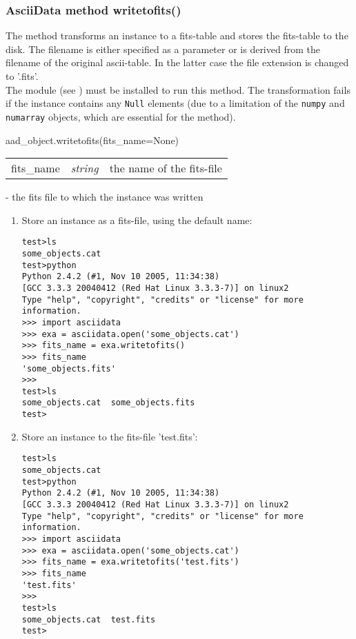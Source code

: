 \subsubsection{AsciiData method writetofits()}
\label{adm_writetofits}
%
The method transforms an \ad instance to a fits-table and stores
the fits-table to the disk. The filename is either specified as a parameter
or is derived from the filename of the original ascii-table. In the latter
case the file extension is changed to '.fits'.\\
The module  (see )
must be installed to run this method. The transformation fails if the
\ad instance contains any {\tt Null} elements (due to a limitation
of the {\tt numpy} and {\tt numarray} objects, which are essential for the
method).

aad\_object.writetofits(fits\_name=None)


\begin{tabular}{lcl}
fits\_name & {\it string} & the name of the fits-file\\
\end{tabular}

- the fits file to which the \ad instance was written

\begin{enumerate}
\item Store an \ad instance as a fits-file, using the default name:
\begin{small}
\begin{verbatim}
test>ls
some_objects.cat
test>python
Python 2.4.2 (#1, Nov 10 2005, 11:34:38)
[GCC 3.3.3 20040412 (Red Hat Linux 3.3.3-7)] on linux2
Type "help", "copyright", "credits" or "license" for more information.
>>> import asciidata
>>> exa = asciidata.open('some_objects.cat')
>>> fits_name = exa.writetofits()
>>> fits_name
'some_objects.fits'
>>>
test>ls
some_objects.cat  some_objects.fits
test>
\end{verbatim}
\end{small}


\item Store an \ad instance to the fits-file 'test.fits':
\begin{small}
\begin{verbatim}
test>ls
some_objects.cat
test>python
Python 2.4.2 (#1, Nov 10 2005, 11:34:38)
[GCC 3.3.3 20040412 (Red Hat Linux 3.3.3-7)] on linux2
Type "help", "copyright", "credits" or "license" for more information.
>>> import asciidata
>>> exa = asciidata.open('some_objects.cat')
>>> fits_name = exa.writetofits('test.fits')
>>> fits_name
'test.fits'
>>>
test>ls
some_objects.cat  test.fits
test>
\end{verbatim}
\end{small}
\end{enumerate}

